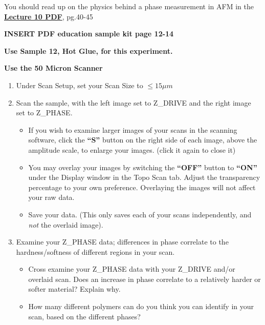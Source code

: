\documentclass{../lab}
\begin{document}
{You should read up on the physics behind a phase measurement in AFM in the \href{http://experimentationlab.berkeley.edu/sites/default/files/AFMImages/Lecture\_10\_AFM.pdf}{\textbf{Lecture 10 PDF}}, pg.40-45

\textbf{​INSERT PDF education sample kit page 12-14}

\textbf{Use Sample 12, Hot Glue, for this experiment.}

\textbf{Use the 50 Micron Scanner }

\begin{enumerate}
    \item Under Scan Setup, set your Scan Size to $\leq 15\mu m$

    \item Scan the sample, with the left image set to Z\_DRIVE and the right image set to Z\_PHASE.

    \begin{itemize}
        \item If you wish to examine larger images of your scans in the scanning software, click the \textbf{``S''} button on the right side of each image, above the amplitude scale, to enlarge your images.  (click it again to close it)

        \item You may overlay your images by switching the\textbf{ ``OFF''} button to \textbf{``ON''} under the Display window in the Topo Scan tab.  Adjust the transparency percentage to your own preference.  Overlaying the images will not affect your raw data.

        \item Save your data. (This only saves each of your scans independently, and \emph{not} the overlaid image).

    \end{itemize}

    \item Examine your Z\_PHASE data; differences in phase correlate to the hardness/softness of different regions in your scan.

    \begin{itemize}
        \item Cross examine your Z\_PHASE data with your Z\_DRIVE and/or overlaid scan.  Does an increase in phase correlate to a relatively harder or softer material? Explain why.

        \item How many different polymers can do you think you can identify in your scan, based on the different phases?


\end{itemize}
\end{enumerate}}
\end{document}
